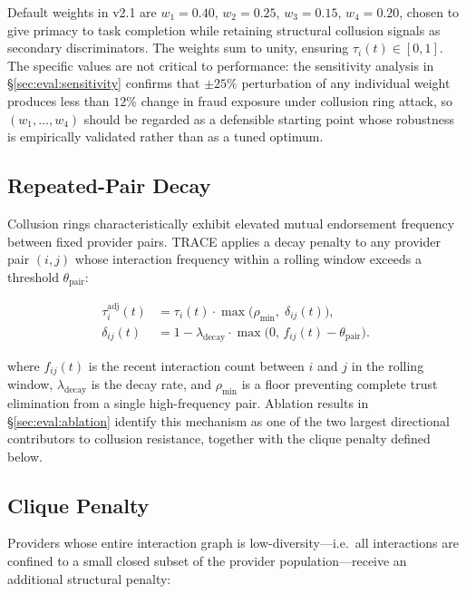 \documentclass[sigconf,nonacm,10pt]{acmart}
\begin{document}
Default weights in v2.1 are $w_1 = 0.40$, $w_2 = 0.25$,
$w_3 = 0.15$, $w_4 = 0.20$, chosen to give primacy to task
completion while retaining structural collusion signals as
secondary discriminators. The weights sum to unity, ensuring
$\tau_i(t) \in [0,1]$. The specific values are not critical to
performance: the sensitivity analysis in
\S\ref{sec:eval:sensitivity} confirms that $\pm 25\%$ perturbation
of any individual weight produces less than $12\%$ change in
fraud exposure under collusion ring attack, so $(w_1, \ldots, w_4)$
should be regarded as a defensible starting point whose
robustness is empirically validated rather than as a tuned
optimum.

\subsection{Repeated-Pair Decay}
\label{sec:decay}

Collusion rings characteristically exhibit elevated mutual
endorsement frequency between fixed provider pairs. TRACE applies
a decay penalty to any provider pair $(i, j)$ whose interaction
frequency within a rolling window exceeds a threshold
$\theta_{\text{pair}}$:

\begin{equation}
\begin{aligned}
  \tau_i^{\text{adj}}(t) &= \tau_i(t) \cdot
    \max\!\bigl(\rho_{\min},\;\delta_{ij}(t)\bigr),\\
  \delta_{ij}(t) &= 1 - \lambda_{\text{decay}} \cdot
    \max\!\bigl(0,\, f_{ij}(t) - \theta_{\text{pair}}\bigr).
\end{aligned}
\label{eq:decay}
\end{equation}

where $f_{ij}(t)$ is the recent interaction count between $i$ and
$j$ in the rolling window, $\lambda_{\text{decay}}$ is the decay
rate, and $\rho_{\min}$ is a floor preventing complete trust
elimination from a single high-frequency pair. Ablation results
in \S\ref{sec:eval:ablation} identify this mechanism as one of
the two largest directional contributors to collusion resistance,
together with the clique penalty defined below.

\subsection{Clique Penalty}

Providers whose entire interaction graph is low-diversity---i.e.\
all interactions are confined to a small closed subset of the
provider population---receive an additional structural penalty:
\end{document}
